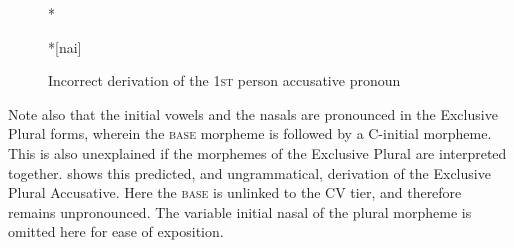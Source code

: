 \documentclass[output=paper]{langscibook}
\begin{document}
\begin{figure}
    \centering
    \begin{minipage}[t]{.1\textwidth}
        *
    \end{minipage}
    \begin{minipage}[t]{.3\textwidth}
    \end{minipage}
    \begin{minipage}[t]{.1\textwidth}
        \rightarrow 
    \end{minipage}
    \begin{minipage}[t]{.3\textwidth}
        \centering
        *[nai]
    \end{minipage}
    \caption{Incorrect derivation of the 1\textsc{st} person accusative pronoun}
    \label{new18}
\end{figure}

Note also that the initial vowels and the nasals are pronounced in the Exclusive Plural forms, wherein the \textsc{base} morpheme is followed by a C-initial morpheme. This is also unexplained if the morphemes of the Exclusive Plural are interpreted together.  shows this predicted, and ungrammatical, derivation of the Exclusive Plural Accusative. Here the \textsc{base} is unlinked to the CV tier, and therefore remains unpronounced. The variable initial nasal of the plural morpheme is omitted here for ease of exposition.
\end{document}
